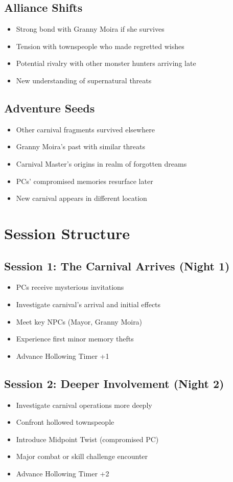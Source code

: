 \documentclass[11pt]{article}
\begin{document}
\subsection{Alliance Shifts}
\begin{itemize}
\item Strong bond with Granny Moira if she survives
\item Tension with townspeople who made regretted wishes
\item Potential rivalry with other monster hunters arriving late
\item New understanding of supernatural threats
\end{itemize}

\subsection{Adventure Seeds}
\begin{itemize}
\item Other carnival fragments survived elsewhere
\item Granny Moira's past with similar threats
\item Carnival Master's origins in realm of forgotten dreams
\item PCs' compromised memories resurface later
\item New carnival appears in different location
\end{itemize}

\section{Session Structure}

\subsection{Session 1: The Carnival Arrives (Night 1)}
\begin{itemize}
\item PCs receive mysterious invitations
\item Investigate carnival's arrival and initial effects
\item Meet key NPCs (Mayor, Granny Moira)
\item Experience first minor memory thefts
\item Advance Hollowing Timer +1
\end{itemize}

\subsection{Session 2: Deeper Involvement (Night 2)}
\begin{itemize}
\item Investigate carnival operations more deeply
\item Confront hollowed townspeople
\item Introduce Midpoint Twist (compromised PC)
\item Major combat or skill challenge encounter
\item Advance Hollowing Timer +2
\end{itemize}
\end{document}
